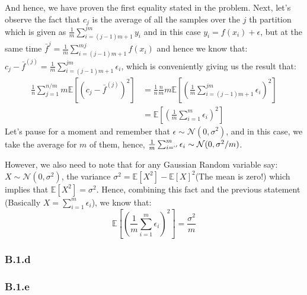 \documentclass[]{article}
\begin{document}
        And hence, we have proven the first equality stated in the problem. Next, let's observe the fact that $c_j$ is the average of all the samples over the $j$ th partition which is given as $\frac{1}{m}\sum_{i = (j - 1)m + 1}^{jm}y_i$ and in this case $y_i = f(x_i) + \epsilon$, but at the same time $\bar{f}^{j} = \frac{1}{m}\sum_{i = (j - 1)m + 1}^{mj}f(x_i)$ and hence we know that: $c_j - \bar{f}^{(j)} = \frac{1}{m}\sum_{i = (j - 1)m + 1}^{jm}\epsilon_i$, which is conveniently giving us the result that: 
        \begin{align*}\tag{B.1.c.3}\label{eqn:B.1.c.3}
            \frac{1}{n}\sum_{j = 1}^{n/m}
            m\mathbb{E}\left[
                (c_j - \bar{f}^{(j)})^2
            \right]
            &=
            \frac{1}{n}\frac{n}{m}m \mathbb{E}\left[
                \left(
                    \frac{1}{m}\sum_{i = (j - 1)m + 1}^{jm}\epsilon_i
                \right)^2
            \right]
            \\
            &= \mathbb{E}\left[
                \left(
                    \frac{1}{m}\sum_{i = 1}^{m}\epsilon_i
                \right)^2
            \right]
        \end{align*}
        Let's pause for a moment and remember that $\epsilon \sim \mathcal{N}(0, \sigma^2)$, and in this case, we take the average for $m$ of them, hence, $\frac{1}{m}\sum_{i = `'}^{m}\epsilon_i\sim \mathcal{N}(0, \sigma^2/m)$. 
        \par
        However, we also need to note that for any Gaussian Random variable say: $X\sim \mathcal{N}(0, \sigma^2)$, the variance $\sigma^2 = \mathbb{E}\left[X^2\right] - \mathbb{E}\left[X\right]^2$(The mean is zero!) which implies that $\mathbb{E}\left[X^2\right] = \sigma^2$. Hence, combining this fact and the previous statement (Basically $X = \sum_{i = 1}^{m}\epsilon_i$), we know that: 
        \begin{equation*}\tag{B.1.c.4}\label{eqn:B.1.c.4}
            \mathbb{E}\left[
                \left(
                    \frac{1}{m}\sum_{i = 1}^{m}\epsilon_i
                \right)^2
            \right] = \frac{\sigma^2}{m}
        \end{equation*}
    \subsubsection*{B.1.d}
        
    \subsubsection*{B.1.e}
        
\end{document}
